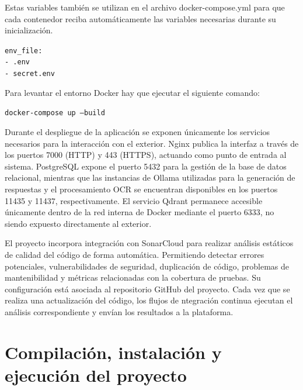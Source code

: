Estas variables también se utilizan en el archivo docker-compose.yml para que cada contenedor reciba automáticamente las variables necesarias durante su inicialización. 

\begin{tcolorbox}[
	colback=cyan!5,
	colframe=cyan!50!black,
	title=docker-compose.yml,
	fonttitle=\bfseries,
	breakable
]
	{\footnotesize
		\noindent
		\texttt{env\_file:}\\
		\hspace*{1em}\texttt{- .env}\\
		\hspace*{1em}\texttt{- secret.env}
	}
\end{tcolorbox}


Para levantar el entorno Docker hay que ejecutar el siguiente comando:

\begin{tcolorbox}[
	colback=black!3,
	colframe=black!30,
	boxrule=0.5pt,
	arc=2mm,
	title= Terminal,
	fonttitle=\bfseries,
	breakable
]
	{\footnotesize
		\noindent
		\texttt{docker-compose up --build}
	}
\end{tcolorbox}

Durante el despliegue de la aplicación se exponen únicamente los servicios necesarios para la interacción con el exterior. Nginx publica la interfaz  a través de los puertos 7000 (HTTP) y 443 (HTTPS), actuando como punto de entrada al sistema. PostgreSQL expone el puerto 5432 para la gestión de la base de datos relacional, mientras que las instancias de Ollama utilizadas para la generación de respuestas y el procesamiento OCR se encuentran disponibles en los puertos 11435 y 11437, respectivamente. El servicio Qdrant permanece accesible únicamente dentro de la red interna de Docker mediante el puerto 6333, no siendo expuesto directamente al exterior.

El proyecto incorpora integración con SonarCloud para realizar análisis estáticos de calidad del código de forma automática. Permitiendo detectar errores potenciales, vulnerabilidades de seguridad, duplicación de código, problemas de mantenibilidad y métricas relacionadas con la cobertura de pruebas. Su configuración está asociada al repositorio GitHub del proyecto. Cada vez que se realiza una actualización del código, los flujos de ntegración continua ejecutan el análisis correspondiente y envían los resultados a la plataforma.


\section{Compilación, instalación y ejecución del proyecto}
\label{prog:comp}

